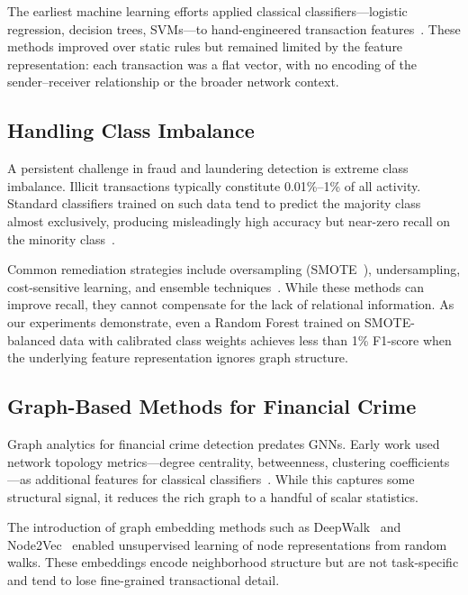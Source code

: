 \documentclass[conference]{IEEEtran}
\begin{document}
The earliest machine learning efforts applied classical classifiers—logistic regression, decision trees, SVMs—to hand-engineered transaction features~\cite{drezewski2012system, tang2005developing}. These methods improved over static rules but remained limited by the feature representation: each transaction was a flat vector, with no encoding of the sender--receiver relationship or the broader network context.

\subsection{Handling Class Imbalance}

A persistent challenge in fraud and laundering detection is extreme class imbalance. Illicit transactions typically constitute 0.01\%--1\% of all activity. Standard classifiers trained on such data tend to predict the majority class almost exclusively, producing misleadingly high accuracy but near-zero recall on the minority class~\cite{ali2022financial}.

Common remediation strategies include oversampling (SMOTE~\cite{chawla2002smote}), undersampling, cost-sensitive learning, and ensemble techniques~\cite{sun2025objective}. While these methods can improve recall, they cannot compensate for the lack of relational information. As our experiments demonstrate, even a Random Forest trained on SMOTE-balanced data with calibrated class weights achieves less than 1\% F1-score when the underlying feature representation ignores graph structure.

\subsection{Graph-Based Methods for Financial Crime}

Graph analytics for financial crime detection predates GNNs. Early work used network topology metrics—degree centrality, betweenness, clustering coefficients—as additional features for classical classifiers~\cite{colladon2017using}. While this captures some structural signal, it reduces the rich graph to a handful of scalar statistics.

The introduction of graph embedding methods such as DeepWalk~\cite{perozzi2014deepwalk} and Node2Vec~\cite{grover2016node2vec} enabled unsupervised learning of node representations from random walks. These embeddings encode neighborhood structure but are not task-specific and tend to lose fine-grained transactional detail.
\end{document}
